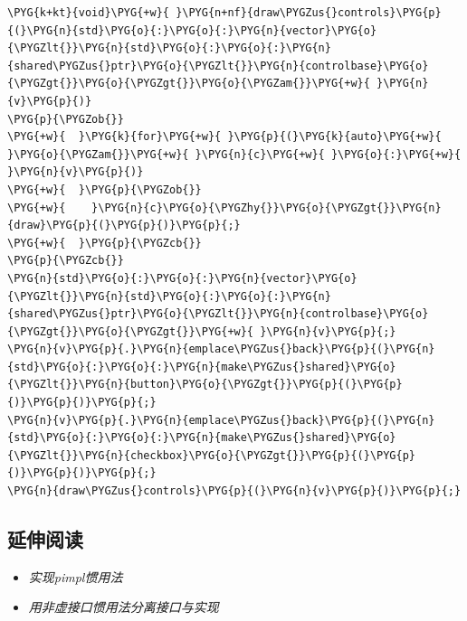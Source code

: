 
\begin{codeblockbg}
\begin{Verbatim}[commandchars=\\\{\},breaklines=true,breakanywhere=true,fontsize=\codefont,xleftmargin=17bp]
\PYG{k+kt}{void}\PYG{+w}{ }\PYG{n+nf}{draw\PYGZus{}controls}\PYG{p}{(}\PYG{n}{std}\PYG{o}{:}\PYG{o}{:}\PYG{n}{vector}\PYG{o}{\PYGZlt{}}\PYG{n}{std}\PYG{o}{:}\PYG{o}{:}\PYG{n}{shared\PYGZus{}ptr}\PYG{o}{\PYGZlt{}}\PYG{n}{controlbase}\PYG{o}{\PYGZgt{}}\PYG{o}{\PYGZgt{}}\PYG{o}{\PYGZam{}}\PYG{+w}{ }\PYG{n}{v}\PYG{p}{)}
\PYG{p}{\PYGZob{}}
\PYG{+w}{  }\PYG{k}{for}\PYG{+w}{ }\PYG{p}{(}\PYG{k}{auto}\PYG{+w}{ }\PYG{o}{\PYGZam{}}\PYG{+w}{ }\PYG{n}{c}\PYG{+w}{ }\PYG{o}{:}\PYG{+w}{ }\PYG{n}{v}\PYG{p}{)}
\PYG{+w}{  }\PYG{p}{\PYGZob{}}
\PYG{+w}{    }\PYG{n}{c}\PYG{o}{\PYGZhy{}}\PYG{o}{\PYGZgt{}}\PYG{n}{draw}\PYG{p}{(}\PYG{p}{)}\PYG{p}{;}
\PYG{+w}{  }\PYG{p}{\PYGZcb{}}
\PYG{p}{\PYGZcb{}}
\PYG{n}{std}\PYG{o}{:}\PYG{o}{:}\PYG{n}{vector}\PYG{o}{\PYGZlt{}}\PYG{n}{std}\PYG{o}{:}\PYG{o}{:}\PYG{n}{shared\PYGZus{}ptr}\PYG{o}{\PYGZlt{}}\PYG{n}{controlbase}\PYG{o}{\PYGZgt{}}\PYG{o}{\PYGZgt{}}\PYG{+w}{ }\PYG{n}{v}\PYG{p}{;}
\PYG{n}{v}\PYG{p}{.}\PYG{n}{emplace\PYGZus{}back}\PYG{p}{(}\PYG{n}{std}\PYG{o}{:}\PYG{o}{:}\PYG{n}{make\PYGZus{}shared}\PYG{o}{\PYGZlt{}}\PYG{n}{button}\PYG{o}{\PYGZgt{}}\PYG{p}{(}\PYG{p}{)}\PYG{p}{)}\PYG{p}{;}
\PYG{n}{v}\PYG{p}{.}\PYG{n}{emplace\PYGZus{}back}\PYG{p}{(}\PYG{n}{std}\PYG{o}{:}\PYG{o}{:}\PYG{n}{make\PYGZus{}shared}\PYG{o}{\PYGZlt{}}\PYG{n}{checkbox}\PYG{o}{\PYGZgt{}}\PYG{p}{(}\PYG{p}{)}\PYG{p}{)}\PYG{p}{;}
\PYG{n}{draw\PYGZus{}controls}\PYG{p}{(}\PYG{n}{v}\PYG{p}{)}\PYG{p}{;}
\end{Verbatim}
\end{codeblockbg}



\subsection{延伸阅读}



\begin{itemize}
\item \textit{实现pimpl惯用法}



\item \textit{用非虚接口惯用法分离接口与实现}

\end{itemize}


